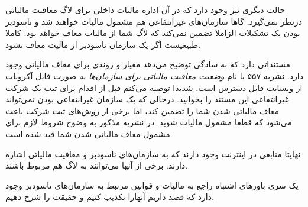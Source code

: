 حالت دیگری نیز وجود دارد که در آن اداره مالیات داخلی  برای لاگ
معافیت مالیاتی درنظر نمی‌گیرد. گاها سازمان‌های غیرانتفاعی هم مشمول مالیات
خواهند شد و ناسودبر بودن یک تشکیلات الزاملا تضمین نمی‌کند که لاگ شما از مالیات
معاف خواهد بود. کاملا طبیعیست اگر یک سازمان ناسودبر از مالیت معاف نشود.

مستنداتی دارد که به سادگی توضیح می‌دهد معیار و روندی برای
معاف مالیاتی وجود دارد.
نشریه ۵۵۷ با نام
{\itshape وضعیت معافیت مالیاتی برای سازمان‌ها}
به صورت فایل آکروبات از وبسایت  قابل دسترس است.
شدیدا توصیه می‌کنم قبل از اقدام برای ثبت یک شرکت غیرانتفاعی
این مستند را بخوانید.
درحالی که یک سازمان غیرانتفاعی بودن نمی‌تواند معاف مالیاتی شدن
شما را تضمین کند، اما برخی از روش‌های ثبت شرکت باعث می‌شود که
قطعا مشمول مالیات شوید. در نشریه مذکور به وضوح شروط لازم برای
مشمول معاف مالیاتی شدن شما قید شده است.


نهایتا منابعی در اینترنت وجود دارند که به سازمان‌های ناسودبر و معافیت مالیاتی
اشاره دارند. برخی از آنها می‌توانند به لاگ هم مربوط باشند.

یک سری باورهای اشتباه راجع به مالیات و قوانین مرتبط به سازمان‌های ناسودبر
وجود دارد که قصد داریم آنهارا تکذیب کنیم و حقیقت را شرح دهیم.


